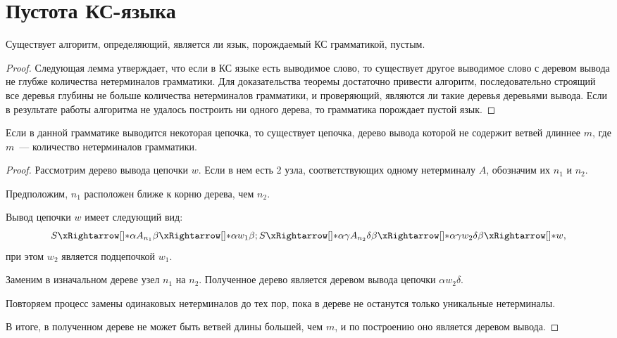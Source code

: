 \section{Пустота КС-языка}
\label{sec:CFLEmptiness}

\begin{theorem}
    Существует алгоритм, определяющий, является ли язык, порождаемый КС грамматикой, пустым.
\end{theorem}

\begin{proof}
    Следующая лемма утверждает, что если в КС языке есть выводимое слово, то существует другое выводимое слово с деревом вывода не глубже количества нетерминалов грамматики.
    Для доказательства теоремы достаточно привести алгоритм, последовательно строящий все деревья глубины не больше количества нетерминалов грамматики, и проверяющий, являются ли такие деревья деревьями вывода.
    Если в результате работы алгоритма не удалось построить ни одного дерева, то грамматика порождает пустой язык.
\end{proof}

\begin{lemma}
    Если в данной грамматике выводится некоторая цепочка, то существует цепочка, дерево вывода которой не содержит ветвей длиннее $m$, где $m$~--- количество нетерминалов грамматики.
\end{lemma}

\begin{proof}
    Рассмотрим дерево вывода цепочки $w$. Если в нем есть 2 узла, соответствующих одному нетерминалу $A$, обозначим их $n_1$ и $n_2$.

    Предположим, $n_1$ расположен ближе к корню дерева, чем $n_2$.

    Вывод цепочки $w$ имеет следующий вид:
    \[S \derives \alpha A_{n_1} \beta \derives \alpha w_1 \beta; S \derives \alpha \gamma A_{n_2} \delta \beta \derives \alpha \gamma w_2 \delta \beta \derives w,\]
    при этом $w_2$ является подцепочкой $w_1$.

    Заменим в изначальном дереве узел $n_1$ на $n_2$. Полученное дерево является деревом вывода цепочки $\alpha w_2 \delta$.

    Повторяем процесс замены одинаковых нетерминалов до тех пор, пока в дереве не останутся только уникальные нетерминалы.

    В итоге, в полученном дереве не может быть ветвей длины большей, чем $m$, и по построению оно является деревом вывода.
\end{proof}
